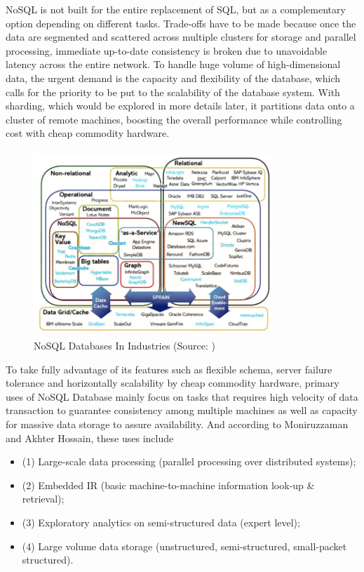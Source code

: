 \noindent NoSQL is not built for the entire replacement of SQL, but as a complementary option depending on different tasks. Trade-offs have to be made because once the data are segmented and scattered across multiple clusters for storage and parallel processing, immediate up-to-date consistency is broken due to  unavoidable latency across the entire network. To handle huge volume of high-dimensional data, the urgent demand is the capacity and flexibility of the database, which calls for the priority to be put to the scalability of the database system.
  With sharding, which would be explored in more details later, it partitions data onto a cluster of remote machines, boosting the overall performance while controlling cost with cheap commodity hardware. 
  
  
\begin{figure}[H]
	\includegraphics[height=7cm, width=9cm]{../../../images/nosql.png}
	\caption{NoSQL Databases In Industries (Source: \cite{DBLP:journals/corr/MoniruzzamanH13})}
\end{figure}

  
\noindent To take fully advantage of its features such as flexible schema, server failure tolerance and  horizontally scalability by cheap commodity hardware, primary uses of NoSQL Database mainly focus on tasks that requires high velocity of data transaction to guarantee consistency among multiple machines as well as capacity for massive data storage to assure availability. And according to Moniruzzaman and Akhter Hossain\cite{DBLP:journals/corr/MoniruzzamanH13}, these uses include 
\begin{itemize}
\item (1) Large-scale data processing (parallel
 processing over distributed systems); 
 \item (2) Embedded IR (basic machine-to-machine
 information look-up \& retrieval); 
 \item (3) Exploratory analytics on semi-structured data (expert
 level); 
 \item (4) Large volume data storage (unstructured, semi-structured, small-packet structured).
\end{itemize}

